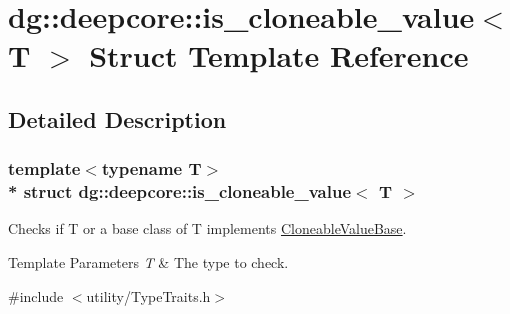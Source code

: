 \hypertarget{structdg_1_1deepcore_1_1is__cloneable__value}{}\section{dg\+:\+:deepcore\+:\+:is\+\_\+cloneable\+\_\+value$<$ T $>$ Struct Template Reference}
\label{structdg_1_1deepcore_1_1is__cloneable__value}


\subsection{Detailed Description}
\subsubsection*{template$<$typename T$>$\\*
struct dg\+::deepcore\+::is\+\_\+cloneable\+\_\+value$<$ T $>$}

Checks if {\ttfamily T} or a base class of {\ttfamily T} implements \hyperlink{structdg_1_1deepcore_1_1_cloneable_value_base}{Cloneable\+Value\+Base}. 


\begin{DoxyTemplParams}{Template Parameters}
{\em T} & The type to check. \\
\hline
\end{DoxyTemplParams}


{\ttfamily \#include $<$utility/\+Type\+Traits.\+h$>$}

